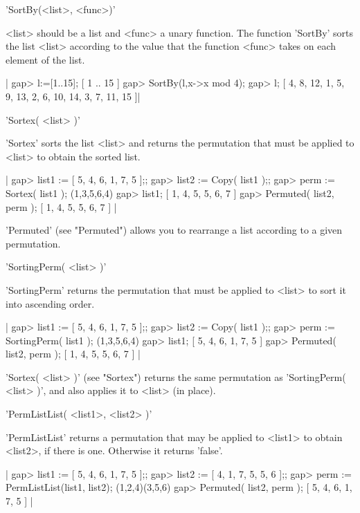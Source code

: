 'SortBy(<list>, <func>)'

<list>  should be a list and <func> a unary function. The function 'SortBy'
sorts the list <list> according to the value that the function <func> takes
on each element of the list.

|   gap> l:=[1..15];
   [ 1 .. 15 ]
   gap> SortBy(l,x->x mod 4);      
   gap> l;
   [ 4, 8, 12, 1, 5, 9, 13, 2, 6, 10, 14, 3, 7, 11, 15 ]|


'Sortex( <list> )'

'Sortex' sorts the list <list> and  returns the  permutation that must be
applied to <list> to obtain the sorted list.

|    gap> list1 := [ 5, 4, 6, 1, 7, 5 ];;
    gap> list2 := Copy( list1 );;
    gap> perm := Sortex( list1 );
    (1,3,5,6,4)
    gap> list1;
    [ 1, 4, 5, 5, 6, 7 ]
    gap> Permuted( list2, perm );
    [ 1, 4, 5, 5, 6, 7 ] |

'Permuted' (see "Permuted") allows you to rearrange a list according to a
given permutation.


'SortingPerm( <list> )'

'SortingPerm' returns  the permutation that must be  applied to <list> to
sort it into ascending order.

|    gap> list1 := [ 5, 4, 6, 1, 7, 5 ];;
    gap> list2 := Copy( list1 );;
    gap> perm := SortingPerm( list1 );
    (1,3,5,6,4)
    gap> list1;
    [ 5, 4, 6, 1, 7, 5 ]
    gap> Permuted( list2, perm );
    [ 1, 4, 5, 5, 6, 7 ] |

'Sortex( <list> )' (see "Sortex") returns the same permutation as
'SortingPerm( <list> )', and also applies it to <list> (in place).


'PermListList( <list1>, <list2> )'

'PermListList' returns a  permutation that may  be applied  to <list1> to
obtain <list2>, if there is one. Otherwise it returns 'false'.

|    gap> list1 := [ 5, 4, 6, 1, 7, 5 ];;
    gap> list2 := [ 4, 1, 7, 5, 5, 6 ];;
    gap> perm := PermListList(list1, list2);
    (1,2,4)(3,5,6)
    gap> Permuted( list2, perm );
    [ 5, 4, 6, 1, 7, 5 ] |


